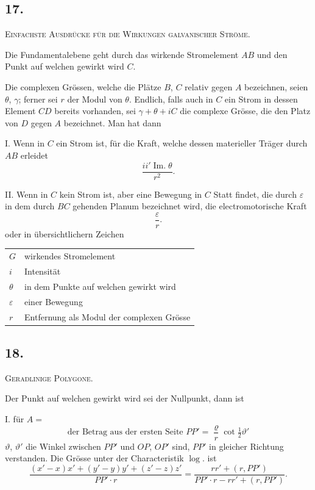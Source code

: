 \documentclass[fontsize=10pt,paper=a5,pagesize=auto]{scrbook}
\newcommand{\origpage}[1]{\marginpar{\footnotesize\textit{S. #1}}}
\begin{document}
\subsection*{17.}
\origpage{616}
\textsc{Einfachste Ausdrücke für die Wirkungen galvanischer Ströme.}

Die Fundamentalebene geht durch das wirkende Stromelement $AB$ und den Punkt auf welchen gewirkt wird $C$.

Die complexen Grössen, welche die Plätze $B$, $C$ relativ gegen $A$ bezeichnen, seien $\theta$, $\gamma$; ferner sei $r$ der Modul von $\theta$. Endlich, falls auch in $C$ ein Strom in dessen Element $CD$ bereits vorhanden, sei $\gamma + \theta + iC$ die complexe Grösse, die den Platz von $D$ gegen $A$ bezeichnet. Man hat dann

\textsc{I.} Wenn in $C$ ein Strom ist, für die Kraft, welche dessen materieller Träger durch $AB$ erleidet
\[
\frac{ii' \operatorname{Im.} \theta}{r^2}.
\]

\textsc{II.} Wenn in $C$ kein Strom ist, aber eine Bewegung in $C$ Statt findet, die durch $\varepsilon$ in dem durch $BC$ gehenden Planum bezeichnet wird, die electromotorische Kraft
\[
\frac{\varepsilon}{r}.
\]
oder in übersichtlichern Zeichen

\begin{center}
\begin{tabular}{@{}ll@{}}
$G$ & wirkendes Stromelement \\
$i$ & Intensität \\
$\theta$ & in dem Punkte auf welchen gewirkt wird \\
$\varepsilon$ & einer Bewegung \\
$r$ & Entfernung als Modul der complexen Grösse \\
\end{tabular}
\end{center}

\subsection*{18.}
\origpage{617}
\textsc{Geradlinige Polygone.}

Der Punkt auf welchen gewirkt wird sei der Nullpunkt, dann ist

\textsc{I.} für $A = $
\[
\text{der Betrag aus der ersten Seite } PP' = \frac{\varrho}{r} \cot \tfrac{1}{2}\vartheta'
\]
$\vartheta$, $\vartheta'$ die Winkel zwischen $PP'$ und $OP$, $OP'$ sind, $PP'$ in gleicher Richtung verstanden. Die Grösse unter der Characteristik $\log.$ ist
\[
\frac{(x' - x)x' + (y' - y)y' + (z' - z)z'}{PP' \cdot r} = \frac{rr' + (r, PP')}{PP' \cdot r - rr' + (r, PP')}.
\]
\end{document}

